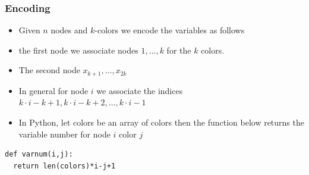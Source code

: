 \documentclass{beamer}
\begin{document}
\begin{frame}[fragile]
  \frametitle{Encoding}
  \begin{itemize}
  \item Given $n$ nodes and $k$-colors we encode the variables as follows
  \item the first node we associate nodes $1,\ldots,k$ for the $k$ colors.
  \item The second node  $x_{k+1},\ldots,x_{2k}$
   \item In general for node $i$ we associate the indices $k\cdot i-k+1, k\cdot i-k+2,\ldots,k\cdot i-1$
\item In Python, let colors be an array of colors then the function below returns the variable number for node $i$ color $j$
  \end{itemize}
\begin{lstlisting}[numbers=none]
def varnum(i,j):
  return len(colors)*i-j+1
\end{lstlisting}
\end{frame}
\end{document}
